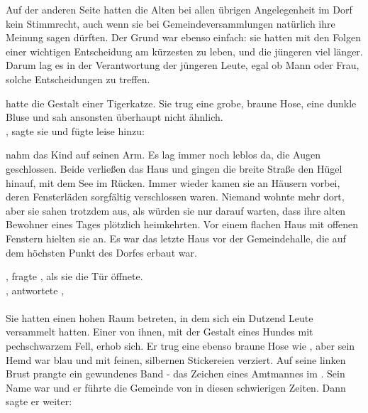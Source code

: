 \begin{Large}
Auf der anderen Seite hatten die Alten bei allen übrigen Angelegenheit im Dorf kein Stimmrecht, auch wenn sie bei Gemeindeversammlungen natürlich ihre Meinung sagen dürften. Der Grund war ebenso einfach: sie hatten mit den Folgen einer wichtigen Entscheidung am kürzesten zu leben, und die jüngeren viel länger. Darum lag es in der Verantwortung der jüngeren Leute, egal ob Mann oder Frau, solche Entscheidungen zu treffen.

{\Mena} hatte die Gestalt einer Tigerkatze. Sie trug eine grobe, braune Hose, eine dunkle Bluse und sah {\Nox} ansonsten überhaupt nicht ähnlich.\\
, sagte sie und fügte leise hinzu: 

{\Eno} nahm das Kind auf seinen Arm. Es lag immer noch leblos da, die Augen geschlossen.
Beide verließen das Haus und gingen die breite Straße den Hügel hinauf, mit dem See im Rücken. 
Immer wieder kamen sie an Häusern vorbei, deren Fensterläden sorgfältig verschlossen waren. Niemand wohnte mehr dort, aber sie sahen trotzdem aus, als würden sie nur darauf warten, dass ihre alten Bewohner eines Tages plötzlich heimkehrten. Vor einem flachen Haus mit offenen Fenstern hielten sie an. Es war das letzte Haus vor der Gemeindehalle, die auf dem höchsten Punkt des Dorfes erbaut war.

, fragte {\Mena}, als sie die Tür öffnete.\\
, antwortete {\Eno}, \\
\\
Sie hatten einen hohen Raum betreten, in dem sich ein Dutzend Leute versammelt hatten. Einer von ihnen, mit der Gestalt eines Hundes mit pechschwarzem Fell, erhob sich. Er trug eine ebenso braune Hose wie {\Mena}, aber sein Hemd war blau und mit feinen, silbernen Stickereien verziert. Auf seine linken Brust prangte ein gewundenes Band - das Zeichen eines Amtmannes im {\Enland}. Sein Name war {\Nox} und er führte die Gemeinde von {\Berna} in diesen schwierigen Zeiten. Dann sagte er weiter: 


\end{Large}
